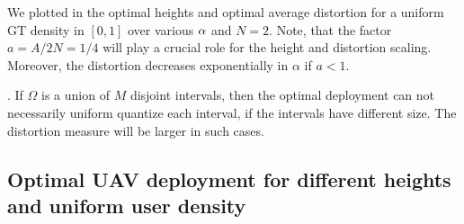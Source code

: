\documentclass[smallabstract,smallcaptions]{dccpaper}
\newenvironment{remark}{\par\vspace{1.5ex}\noindent{\em Remark\/}.}{\par\vspace{1.5ex}}
\begin{document}
\fi
\color{black}
We plotted in  the optimal heights and optimal average distortion for a uniform GT density in
$[0,1]$ over various $\alpha$ and $N=2$. Note, that the factor $a=A/2N=1/4$ will play a crucial role for the height and
distortion scaling. Moreover, the distortion decreases exponentially in $\alpha$ if $a<1$.
%
\begin{remark}
  If $\Omega$ is a union of $M$ disjoint intervals, then the optimal deployment can not necessarily uniform quantize
  each interval, if the intervals have different size. 
  The distortion measure will be larger in such cases.
\end{remark}
\fi
\subsection{Optimal UAV deployment for different heights and uniform user density}
\end{document}
